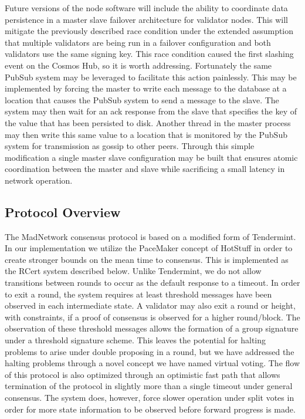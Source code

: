 Future versions of the node software will include the ability to
coordinate data persistence in a master slave failover architecture for
validator nodes.
This will mitigate the previously described race condition under the
extended assumption that multiple validators are being run in a
failover configuration and both validators use the same signing key.
This race condition caused the first slashing event on the Cosmos Hub,
so it is worth addressing.
Fortunately the same PubSub system may be leveraged to facilitate this
action painlessly.
This may be implemented by forcing the master to write each message to
the database at a location that causes the PubSub system to send a
message to the slave.
The system may then wait for an ack response from the slave that
specifies the key of the value that has been persisted to disk.
Another thread in the master process may then write this same value to
a location that is monitored by the PubSub system for transmission as
gossip to other peers.
Through this simple modification a single master slave configuration
may be built that ensures atomic coordination between the master and
slave while sacrificing a small latency in network operation.


\subsection{Protocol Overview}

The MadNetwork consensus protocol is based on a modified form of
Tendermint.
In our implementation we utilize the PaceMaker concept of HotStuff in
order to create stronger bounds on the mean time to consensus.
This is implemented as the RCert system described below.
Unlike Tendermint, we do not allow transitions between rounds to occur
as the default response to a timeout.
In order to exit a round, the system requires at least threshold
messages have been observed in each intermediate state.
A validator may also exit a round or height, with constraints, if a
proof of consensus is observed for a higher round/block.
The observation of these threshold messages allows the formation of a
group signature under a threshold signature scheme.
This leaves the potential for halting problems to arise under double
proposing in a round, but we have addressed the halting problems
through a novel concept we have named virtual voting.
The flow of this protocol is also optimized through an optimistic fast
path that allows termination of the protocol in slightly more than a
single timeout under general consensus.
The system does, however, force slower operation under split votes in
order for more state information to be observed before forward progress
is made.

